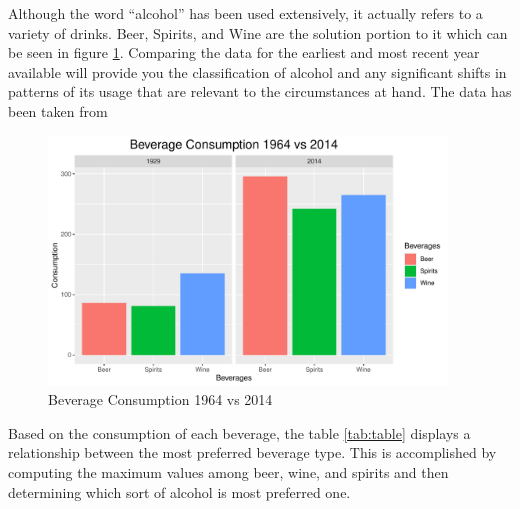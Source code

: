 \documentclass[11pt,a4paper,]{article}
\begin{document}
Although the word ``alcohol'' has been used extensively, it actually refers to a variety of drinks. Beer, Spirits, and Wine are the solution portion to it which can be seen in figure \ref{fig:beveragestype}. Comparing the data for the earliest and most recent year available will provide you the classification of alcohol and any significant shifts in patterns of its usage that are relevant to the circumstances at hand.
The data has been taken from \textcite{owidalcoholconsumption}

\begin{figure}

{\centering \includegraphics[width=400px,height=250px]{alcohol_analysis_files/figure-latex/beveragestype-1} 

}

\caption{Beverage Consumption 1964 vs 2014}\label{fig:beveragestype}
\end{figure}

Based on the consumption of each beverage, the table \ref{tab:table} displays a relationship between the most preferred beverage type. This is accomplished by computing the maximum values among beer, wine, and spirits and then determining which sort of alcohol is most preferred one.
\end{document}
